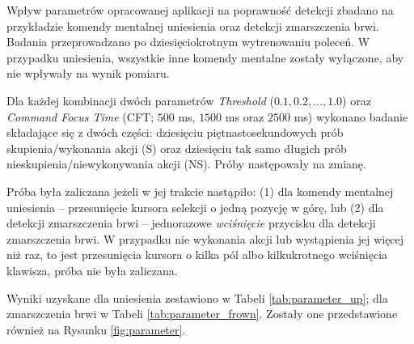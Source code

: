 \documentclass[skorowidz,skroty]{dyplomWEZUT}
\begin{document}
Wpływ parametrów opracowanej aplikacji na poprawność detekcji zbadano na przykładzie komendy mentalnej uniesienia oraz detekcji zmarszczenia brwi. Badania przeprowadzano po dziesięciokrotnym wytrenowaniu poleceń. W przypadku uniesienia, wszystkie inne komendy mentalne zostały wyłączone, aby nie wpływały na wynik pomiaru.

Dla każdej kombinacji dwóch parametrów \textit{Threshold} ($0.1, 0.2, \dots, 1.0$) oraz \textit{Command Focus Time} (CFT; $500$ ms, $1500$ ms oraz $2500$ ms) wykonano badanie składające się z dwóch części: dziesięciu piętnastosekundowych prób skupienia/wykonania akcji (S) oraz dziesięciu tak samo długich prób nieskupienia/niewykonywania akcji (NS). Próby następowały na zmianę.

Próba była zaliczana jeżeli w jej trakcie nastąpiło: (1) dla komendy mentalnej uniesienia -- przesunięcie kursora selekcji o jedną pozycję w górę, lub (2) dla detekcji zmarszczenia brwi -- jednorazowe \textit{wciśnięcie} przycisku dla detekcji zmarszczenia brwi. W przypadku nie wykonania akcji lub wystąpienia jej więcej niż raz, to jest przesunięcia kursora o kilka pól albo kilkukrotnego wciśnięcia klawisza, próba nie była zaliczana.

Wyniki uzyskane dla uniesienia zestawiono w Tabeli \vref{tab:parameter_up}; dla zmarszczenia brwi w Tabeli \vref{tab:parameter_frown}. Zostały one przedstawione również na Rysunku \vref{fig:parameter}.
\end{document}
